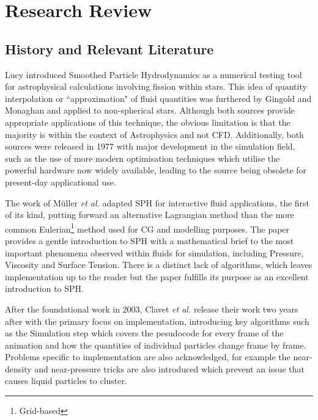 \documentclass[write-up.tex]{subfiles}
\begin{document}
\section{Research Review}
\subsection{History and Relevant Literature}
Lucy \cite{lucy} introduced Smoothed Particle Hydrodynamics as a numerical testing tool for astrophysical calculations involving fission within stars. This idea of quantity interpolation or ``approximation" of fluid quantities was furthered by Gingold and Monaghan \cite{gingold} and applied to non-spherical stars. Although both sources provide appropriate applications of this technique, the obvious limitation is that the majority is within the context of Astrophysics and not CFD. Additionally, both sources were released in 1977 with major development in the simulation field, such as the use of more modern optimisation techniques which utilise the powerful hardware now widely available, leading to the source being obsolete for present-day applicational use.

The work of Müller \textit{et al.} \cite{muller} adapted SPH for interactive fluid applications, the first of its kind, putting forward an alternative Lagrangian method than the more common Eulerian\footnote{Grid-based} method used for CG and modelling purposes. The paper provides a gentle introduction to SPH with a mathematical brief to the most important phenomena observed within fluids for simulation, including Pressure, Viscosity and Surface Tension. There is a distinct lack of algorithms, which leaves implementation up to the reader but the paper fulfills its purpose as an excellent introduction to SPH.

After the foundational work in 2003, Clavet \textit{et al.} \cite{clavet} release their work two years after with the primary focus on implementation, introducing key algorithms such as the Simulation step which covers the pesudocode for every frame of the animation and how the quantities of individual particles change frame by frame. Problems specific to implementation are also acknowledged, for example the near-density and near-pressure tricks are also introduced which prevent an issue that causes liquid particles to cluster.%
\end{document}
